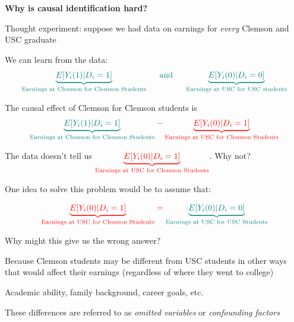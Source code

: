 \documentclass[11pt, aspectratio=169]{beamer}
\newenvironment{wideitemize}{\itemize\addtolength{\itemsep}{5pt}}{\enditemize}
\begin{document}
\begin{frame}{\bf \large Why is causal identification hard?}
	
	\begin{wideitemize}
		
		\item
		Thought experiment: suppose we had data on earnings for \textit{every} Clemson and USC graduate
		
		
		\item
		We can learn from the data:
		$$\color{teal} \underbrace{E[ Y_i(1) | D_i=1  ] }_{\text{Earnings at Clemson for Clemson Students}} \hspace{0.5cm}  \text{and} \hspace{0.5cm} \underbrace{E[Y_i(0) | D_i = 0]	}_{\text{Earnings at USC for USC students}}$$
		
		\pause 
		\item
		The causal effect of Clemson for Clemson students is 
		$$ \color{teal}{\underbrace{E[ Y_i(1) | D_i=1  ] }_{\text{Earnings at Clemson for Clemson Students}}} - \color{red}{ \underbrace{E[ Y_i(0) | D_i=1  ] }_{\text{Earnings at USC for Clemson Students}}}$$ 
		
		\pause 
		\item
		The data doesn't tell us $\color{red}{ \underbrace{E[ Y_i(0) | D_i=1 ] }_{\text{Earnings at USC for Clemson Students}}}$. Why not? 
		
	\end{wideitemize}
	
\end{frame}


\begin{frame}
	\begin{wideitemize}
		\item
		One idea to solve this problem would be to assume that: 
		
		$$ \color{red}{ \underbrace{E[ Y_i(0) | D_i=1  ] }_{\text{Earnings at USC for Clemson Students}}} = \color{teal}{ \underbrace{E[ Y_i(0) | D_i=0 ] }_{\text{Earnings at USC for USC Students}}}$$
		
		\item
		Why might this give us the wrong answer? 
		
		\pause
		
		\item
		Because Clemson students may be different from USC students in other ways that would affect their earnings (regardless of where they went to college)
		
		\begin{wideitemize}
			\item 
			Academic ability, family background, career goals, etc.
		\end{wideitemize}
		
		\item
		These differences are referred to as \textit{omitted variables} or \textit{confounding factors}
	\end{wideitemize}
\end{frame}
\end{document}
